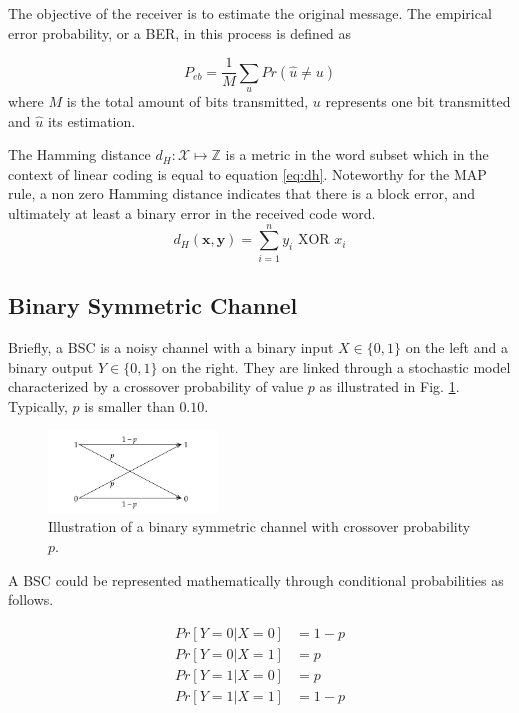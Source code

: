 \documentclass[conference]{IEEEtran}
\begin{document}
The objective of the receiver is to estimate the original message. The empirical error probability, or a BER, in this process is defined as

\begin{equation}
P_{eb} = \frac{1}{M} \underset{u}{\sum}Pr(\hat{u}\neq u)
\end{equation}
where $M$ is the total amount of bits transmitted, $u$ represents one bit transmitted and $\hat{u}$ its estimation.

The Hamming distance $d_H:\mathcal{X}\mapsto \mathbb{Z}$ is a metric in the word subset which in the context of linear coding is equal to equation \ref{eq:dh}. Noteworthy for the MAP rule, a non zero Hamming distance indicates that there is a block error, and ultimately at least a binary error in the received code word.
\begin{equation}\label{eq:dh}
d_H(\textbf{x},\textbf{y}) = \sum_{i=1}^{n} y_i \text{ XOR } x_i 
\end{equation}  

\subsection{Binary Symmetric Channel}

Briefly, a BSC is a noisy channel with a binary input $X\in \{0,1\}$ on the left and a binary output $Y\in \{0,1\}$ on the right. They are linked through a stochastic model characterized by a crossover probability of value $p$ as illustrated in Fig. \ref{fig:BSC}. Typically, $p$ is smaller than $0.10$.


\begin{figure}[!ht]
  \centering
    \includegraphics[width=0.4\textwidth]{images/BSC}
    \caption{Illustration of a binary symmetric channel with crossover probability $p$.}\label{fig:BSC}
\end{figure}

A BSC could be represented mathematically through conditional probabilities as follows.

\begin{align*}
Pr[ Y = 0 | X = 0 ] &= 1 - p \\
Pr[ Y = 0 | X = 1 ] &= p \\
Pr[ Y = 1 | X = 0 ] &= p \\
Pr[ Y = 1 | X = 1 ] &= 1 - p
\end{align*}
\end{document}
